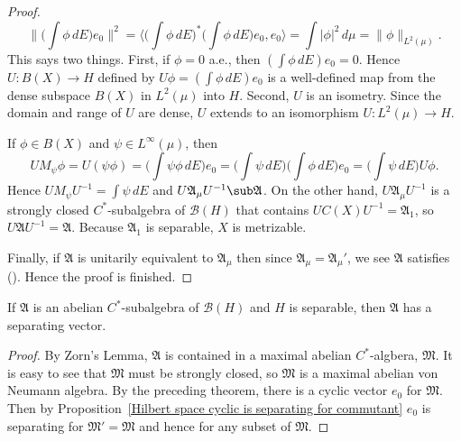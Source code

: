 \begin{proof}
\[\Big\|\Big(\int\phi\,dE\Big)e_0\Big\|^2=\langle\Big(\int\phi\,dE\Big)^*\Big(\int\phi\,dE\Big)e_0,e_0\rangle=\int|\phi|^2\,d\mu=\|\phi\|_{L^2(\mu)}.\]
This says two things. First, if $\phi=0$ a.e., then $(\int\phi\,dE)e_0=0$. Hence $U:B(X)\to H$ defined by $U\phi=(\int\phi\,dE)e_0$ is a well-defined map from the dense subspace $B(X)$ in $L^2(\mu)$ into $H$. Second, $U$ is an isometry. Since the domain and range of $U$ are dense, $U$ extends to an isomorphism $U:L^2(\mu)\to H$.\par
If $\phi\in B(X)$ and $\psi\in L^\infty(\mu)$, then 
\[UM_\psi\phi=U(\psi\phi)=\Big(\int\psi\phi\,dE\Big)e_0=\Big(\int\psi\,dE\Big)\Big(\int\phi\,dE\Big)e_0=\Big(\int\psi\,dE\Big)U\phi.\]
Hence $UM_\psi U^{-1}=\int\psi\,dE$ and $U\mathfrak{A}_\mu U^{-1}\sub\mathfrak{A}$. On the other hand, $U\mathfrak{A}_\mu U^{-1}$ is a strongly closed $C^*$-subalgebra of $\mathcal{B}(H)$ that contains $UC(X)U^{-1}=\mathfrak{A}_1$, so $U\mathfrak{A}U^{-1}=\mathfrak{A}$. Because $\mathfrak{A}_1$ is separable, $X$ is metrizable.\par
Finally, if $\mathfrak{A}$ is unitarily equivalent to $\mathfrak{A}_\mu$ then since $\mathfrak{A}_\mu=\mathfrak{A}_\mu'$, we see $\mathfrak{A}$ satisfies (). Hence the proof is finished.
\end{proof}
\begin{corollary}\label{Hilbert space abelian subalgebra separating vector if seperable}
If $\mathfrak{A}$ is an abelian $C^*$-subalgebra of $\mathcal{B}(H)$ and $H$ is separable, then $\mathfrak{A}$ has a separating vector.
\end{corollary}
\begin{proof}
By Zorn's Lemma, $\mathfrak{A}$ is contained in a maximal abelian $C^*$-algbera, $\mathfrak{M}$. It is easy to see that $\mathfrak{M}$ must be strongly closed, so $\mathfrak{M}$ is a maximal abelian von Neumann algebra. By the preceding theorem, there is a cyclic vector $e_0$ for $\mathfrak{M}$. Then by Proposition~\ref{Hilbert space cyclic is separating for commutant} $e_0$ is separating for $\mathfrak{M}'=\mathfrak{M}$ and hence for any subset of $\mathfrak{M}$.
\end{proof}
